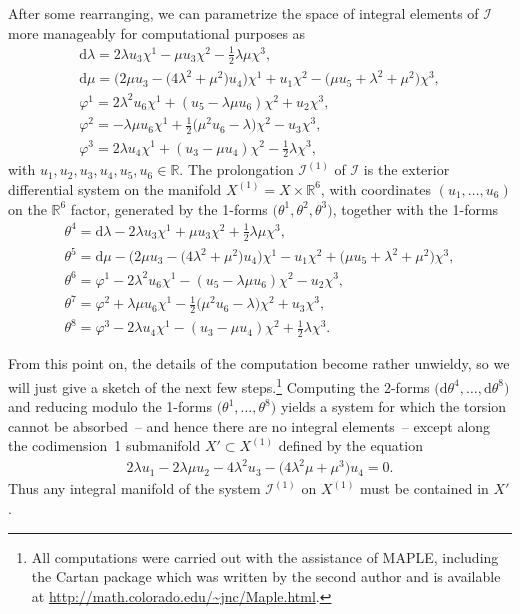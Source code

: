\documentclass[pdftex]{sigma}
\numberwithin{equation}{section}
\renewcommand{\d}{\mathrm{d}}%
\newcommand{\cI}{{\mathcal I}}
\newcommand{\bbR}{{\mathbb R}}
\begin{document}
After some rearranging, we can parametrize the space of integral elements of $\cI$ more ma\-na\-geably for computational purposes as
\begin{gather*}%
\d\lambda = 2 \lambda u_3 \chi^1 - \mu u_3 \chi^2 - \tfrac{1}{2}\lambda \mu \chi^3, \\
\d\mu = \big(2\mu u_3 - \big(4\lambda^2 + \mu^2\big)u_4\big) \chi^1 + u_1 \chi^2 - \big(\mu u_5 + \lambda^2 + \mu^2\big) \chi^3, \\
\varphi^1 = 2\lambda^2 u_6 \chi^1 + (u_5 - \lambda\mu u_6) \chi^2 + u_2 \chi^3, \\
\varphi^2 = -\lambda \mu u_6 \chi^1 + \tfrac{1}{2}\big(\mu^2 u_6 - \lambda\big) \chi^2 - u_3 \chi^3, \\
\varphi^3 = 2\lambda u_4 \chi^1 + (u_3 - \mu u_4) \chi^2 - \tfrac{1}{2}\lambda \chi^3,
\end{gather*}
with $u_1, u_2, u_3, u_4, u_5, u_6 \in \bbR$. The prolongation $\cI^{(1)}$ of $\cI$ is the exterior differential system on the manifold $X^{(1)} = X \times \bbR^6$, with coordinates $(u_1,\ldots, u_6)$ on the $\bbR^6$ factor, generated by the 1-forms $\big(\theta^1, \theta^2, \theta^3\big)$, together with the 1-forms
\begin{gather}
\theta^4 = \d\lambda - 2 \lambda u_3 \chi^1 + \mu u_3 \chi^2 + \tfrac{1}{2}\lambda \mu \chi^3, \nonumber\\
\theta^5 = \d\mu - \big(2\mu u_3 - \big(4\lambda^2 + \mu^2\big)u_4\big) \chi^1 - u_1 \chi^2 + \big(\mu u_5 + \lambda^2 + \mu^2\big) \chi^3, \nonumber\\
\theta^6 = \varphi^1 - 2\lambda^2 u_6 \chi^1 - (u_5 - \lambda\mu u_6) \chi^2 - u_2 \chi^3, \nonumber\\
\theta^7 = \varphi^2 + \lambda \mu u_6 \chi^1 - \tfrac{1}{2}\big(\mu^2 u_6 - \lambda\big) \chi^2 + u_3 \chi^3, \nonumber\\
\theta^8 = \varphi^3 - 2\lambda u_4 \chi^1 - (u_3 - \mu u_4) \chi^2 + \tfrac{1}{2}\lambda \chi^3.\label{rank1-forms-in-I1}
\end{gather}

From this point on, the details of the computation become rather unwieldy, so we will just give a sketch of the next few steps.\footnote{All computations were carried out with the assistance of MAPLE, including the Cartan package which was written by the second author and is available at \url{http://math.colorado.edu/~jnc/Maple.html}.}
Computing the 2-forms $\big(\d\theta^4,\ldots,\d\theta^8\big)$ and reducing modulo the 1-forms $\big(\theta^1,\ldots,\theta^8\big)$ yields a system for which the torsion cannot be absorbed~-- and hence there are no integral elements~-- except along the codimension~1 submanifold $X' \subset X^{(1)}$ defined by the equation
\begin{gather}\label{rank1-torsion1}
2\lambda u_1 - 2\lambda \mu u_2 - 4\lambda^2 u_3 - \big(4 \lambda^2 \mu + \mu^3\big) u_4 = 0.
\end{gather}
Thus any integral manifold of the system $\cI^{(1)}$ on $X^{(1)}$ must be contained in $X'$.
\end{document}
